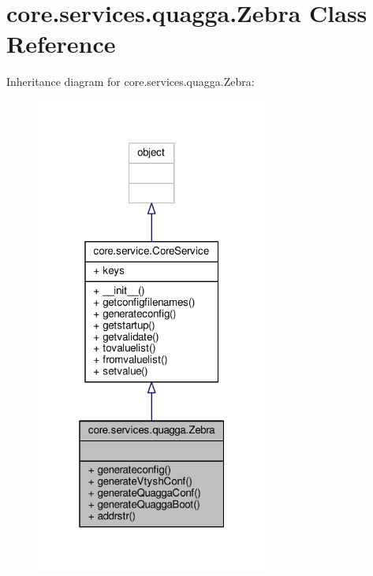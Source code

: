 \hypertarget{classcore_1_1services_1_1quagga_1_1_zebra}{\section{core.\+services.\+quagga.\+Zebra Class Reference}
\label{classcore_1_1services_1_1quagga_1_1_zebra}
}


Inheritance diagram for core.\+services.\+quagga.\+Zebra\+:
\nopagebreak
\begin{figure}[H]
\begin{center}
\leavevmode
\includegraphics[width=217pt]{classcore_1_1services_1_1quagga_1_1_zebra__inherit__graph}
\end{center}
\end{figure}


